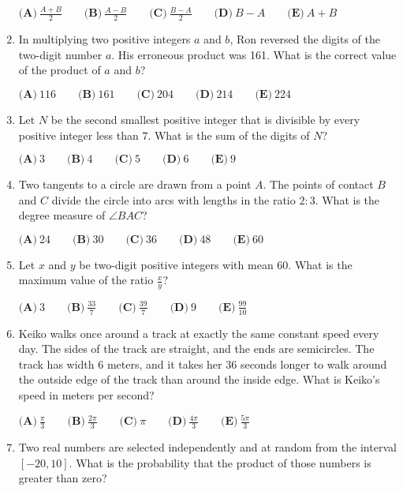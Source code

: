 \documentclass{article}
\begin{document}
\begin{enumerate}[label=\arabic*., itemsep=0.5em]
$\textbf{(A)}\ \frac{A+B}{2} \qquad \textbf{(B)}\ \frac{A-B}{2} \qquad \textbf{(C)}\ \frac{B-A}{2} \qquad \textbf{(D)}\ B-A \qquad \textbf{(E)}\ A+B$\par \vspace{0.5em}\item In multiplying two positive integers $a$ and $b$, Ron reversed the digits of the two-digit number $a$.  His erroneous product was 161.  What is the correct value of the product of $a$ and $b$?

$\textbf{(A)}\ 116 \qquad \textbf{(B)}\ 161 \qquad \textbf{(C)}\ 204 \qquad \textbf{(D)}\ 214 \qquad \textbf{(E)}\ 224$\par \vspace{0.5em}\item Let $N$ be the second smallest positive integer that is divisible by every positive integer less than $7$.  What is the sum of the digits of $N$?

$\textbf{(A)}\ 3 \qquad \textbf{(B)}\ 4 \qquad \textbf{(C)}\ 5 \qquad \textbf{(D)}\ 6 \qquad \textbf{(E)}\ 9$\par \vspace{0.5em}\item Two tangents to a circle are drawn from a point $A$.  The points of contact $B$ and $C$ divide the circle into arcs with lengths in the ratio $2 : 3$.  What is the degree measure of $\angle{BAC}$?

$\textbf{(A)}\ 24 \qquad \textbf{(B)}\ 30 \qquad \textbf{(C)}\ 36 \qquad \textbf{(D)}\ 48 \qquad \textbf{(E)}\ 60$\par \vspace{0.5em}\item Let $x$ and $y$ be two-digit positive integers with mean $60$.  What is the maximum value of the ratio $\frac{x}{y}$?

$\textbf{(A)}\ 3 \qquad \textbf{(B)}\ \frac{33}{7} \qquad \textbf{(C)}\ \frac{39}{7} \qquad \textbf{(D)}\ 9 \qquad \textbf{(E)}\ \frac{99}{10}$\par \vspace{0.5em}\item Keiko walks once around a track at exactly the same constant speed every day. The sides of the track are straight, and the ends are semicircles. The track has width $6$ meters, and it takes her $36$ seconds longer to walk around the outside edge of the track than around the inside edge. What is Keiko's speed in meters per second?

$\textbf{(A)}\ \frac{\pi}{3} \qquad \textbf{(B)}\ \frac{2\pi}{3} \qquad \textbf{(C)}\ \pi \qquad \textbf{(D)}\ \frac{4\pi}{3} \qquad \textbf{(E)}\ \frac{5\pi}{3}$\par \vspace{0.5em}\item Two real numbers are selected independently and at random from the interval $[-20,10]$.  What is the probability that the product of those numbers is greater than zero?


\end{enumerate}
\end{document}
